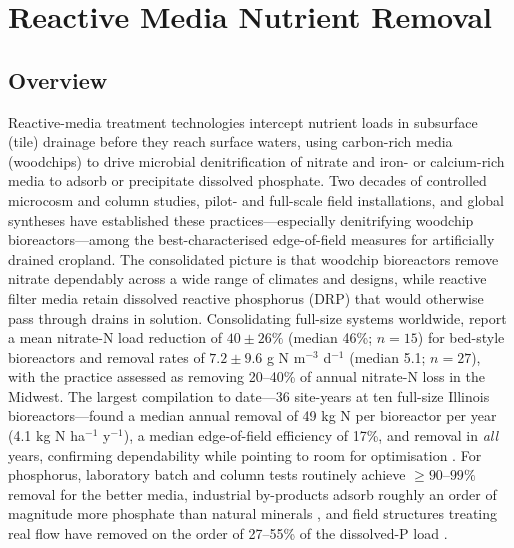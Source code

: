 \documentclass[11pt]{article}
\begin{document}
\section*{Reactive Media Nutrient Removal}

\subsection{Overview}

Reactive-media treatment technologies intercept nutrient loads in subsurface (tile) drainage before they reach surface waters, using carbon-rich media (woodchips) to drive microbial denitrification of nitrate and iron- or calcium-rich media to adsorb or precipitate dissolved phosphate. Two decades of controlled microcosm and column studies, pilot- and full-scale field installations, and global syntheses have established these practices---especially denitrifying woodchip bioreactors---among the best-characterised edge-of-field measures for artificially drained cropland. The consolidated picture is that woodchip bioreactors remove nitrate dependably across a wide range of climates and designs, while reactive filter media retain dissolved reactive phosphorus (DRP) that would otherwise pass through drains in solution. Consolidating full-size systems worldwide, \textcite{Christianson2021} report a mean nitrate-N load reduction of $40 \pm 26\%$ (median 46\%; $n=15$) for bed-style bioreactors and removal rates of $7.2 \pm 9.6$ g N m$^{-3}$ d$^{-1}$ (median 5.1; $n=27$), with the practice assessed as removing 20--40\% of annual nitrate-N loss in the Midwest. The largest compilation to date---36 site-years at ten full-size Illinois bioreactors---found a median annual removal of 49 kg N per bioreactor per year (4.1 kg N ha$^{-1}$ y$^{-1}$), a median edge-of-field efficiency of 17\%, and removal in \emph{all} years, confirming dependability while pointing to room for optimisation \parencite{Christianson2026}. For phosphorus, laboratory batch and column tests routinely achieve $\geq 90$--$99\%$ removal for the better media, industrial by-products adsorb roughly an order of magnitude more phosphate than natural minerals \parencite{Sellner2019b}, and field structures treating real flow have removed on the order of 27--55\% of the dissolved-P load \parencite{Penn2020,Penn2024,Shedekar2020}.
\end{document}
